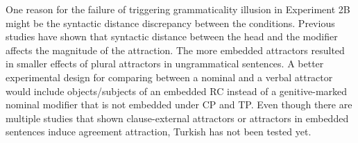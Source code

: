 One reason for the failure of triggering grammaticality illusion in Experiment 2B might be the syntactic distance discrepancy between the conditions. Previous studies have shown that syntactic distance between the head and the modifier affects the magnitude of the attraction. The more embedded attractors resulted in smaller effects of plural attractors in ungrammatical sentences. A better experimental design for comparing between a nominal and a verbal attractor would include objects/subjects of an embedded RC instead of a genitive-marked nominal modifier that is not embedded under CP and TP. Even though there are multiple studies that shown clause-external attractors or attractors in embedded sentences induce agreement attraction, Turkish has not been tested yet.
